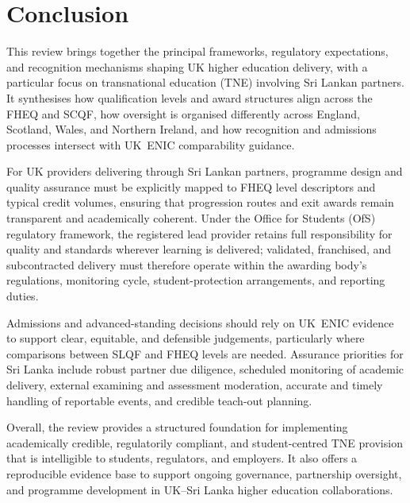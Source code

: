 \section{Conclusion}

This review brings together the principal frameworks, regulatory expectations, and recognition
mechanisms shaping UK higher education delivery, with a particular focus on transnational
education (TNE) involving Sri Lankan partners. It synthesises how qualification levels and
award structures align across the FHEQ and SCQF, how oversight is organised differently across
England, Scotland, Wales, and Northern Ireland, and how recognition and admissions processes
intersect with UK~ENIC comparability guidance.

For UK providers delivering through Sri Lankan partners, programme design and quality
assurance must be explicitly mapped to FHEQ level descriptors and typical credit volumes,
ensuring that progression routes and exit awards remain transparent and academically coherent.
Under the Office for Students (OfS) regulatory framework, the registered lead provider retains
full responsibility for quality and standards wherever learning is delivered; validated,
franchised, and subcontracted delivery must therefore operate within the awarding body's
regulations, monitoring cycle, student-protection arrangements, and reporting duties.

Admissions and advanced-standing decisions should rely on UK~ENIC evidence to support clear,
equitable, and defensible judgements, particularly where comparisons between SLQF and FHEQ
levels are needed. Assurance priorities for Sri Lanka include robust partner due diligence,
scheduled monitoring of academic delivery, external examining and assessment moderation,
accurate and timely handling of reportable events, and credible teach-out planning.

Overall, the review provides a structured foundation for implementing academically credible,
regulatorily compliant, and student-centred TNE provision that is intelligible to students,
regulators, and employers. It also offers a reproducible evidence base to support ongoing
governance, partnership oversight, and programme development in UK–Sri Lanka higher education
collaborations.

